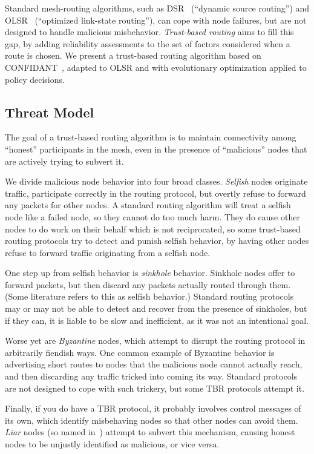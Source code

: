 \documentclass{article}
\begin{document}
Standard mesh-routing algorithms, such as DSR~\cite{s-dsr} (“dynamic
source routing”) and OLSR~\cite{s-olsr} (“optimized link-state
routing”), can cope with node failures, but are not designed to handle
malicious misbehavior.  \emph{Trust-based routing} aims to fill this
gap, by adding reliability assessments to the set of factors
considered when a route is chosen.  We present a trust-based routing
algorithm based on CONFIDANT~\cite{buchegger2002b}, adapted to OLSR
and with evolutionary optimization applied to policy decisions.

\subsection{Threat Model}

The goal of a trust-based routing algorithm is to maintain
connectivity among “honest” participants in the mesh, even in the
presence of “malicious” nodes that are actively trying to subvert it.

We divide malicious node behavior into four broad classes.
\emph{Selfish} nodes originate traffic, participate correctly in the
routing protocol, but overtly refuse to forward any packets for other
nodes.  A standard routing algorithm will treat a selfish node like a
failed node, so they cannot do too much harm.  They do cause other
nodes to do work on their behalf which is not reciprocated, so some
trust-based routing protocols try to detect and punish selfish
behavior, by having other nodes refuse to forward traffic originating
from a selfish node.

One step up from selfish behavior is \emph{sinkhole} behavior. Sinkhole
nodes offer to forward packets, but then discard any packets actually
routed through them.  (Some literature refers to this as selfish
behavior.)  Standard routing protocols may or may not be able to
detect and recover from the presence of sinkholes, but if they can, it
is liable to be slow and inefficient, as it was not an intentional
goal.

Worse yet are \emph{Byzantine} nodes, which attempt to disrupt the
routing protocol in arbitrarily fiendish ways.  One common example of
Byzantine behavior is advertising short routes to nodes that the
malicious node cannot actually reach, and then discarding any traffic
tricked into coming its way.  Standard protocols are not designed to
cope with such trickery, but some TBR protocols attempt it.

Finally, if you do have a TBR protocol, it probably involves control
messages of its own, which identify misbehaving nodes so that other
nodes can avoid them.  \emph{Liar} nodes (so named
in~\cite{buchegger2003}) attempt to subvert this mechanism, causing
honest nodes to be unjustly identified as malicious, or vice versa.
\end{document}
